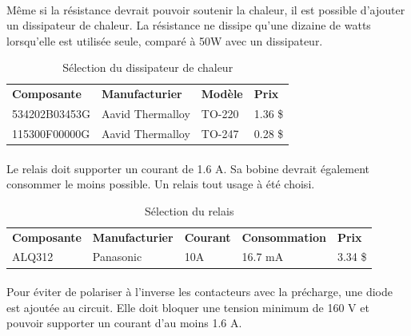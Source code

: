 		\paragraph*{}
		Même si la résistance devrait pouvoir soutenir la chaleur, il est possible d'ajouter un dissipateur de chaleur. La résistance ne dissipe qu'une dizaine de watts lorsqu'elle est utilisée seule, comparé à 50W avec un dissipateur.
				
		\begin{table}[H]
			\centering
			\caption{Sélection du dissipateur de chaleur}
			\label{DissipateurPrecharge}
			\begin{tabular}{|p{3cm}|p{4cm}|p{2cm}|p{1.5cm}|}
				\hline
				\textbf{Composante} & \textbf{Manufacturier} & \textbf{Modèle} & \textbf{Prix}
				\\ \hhline{|=|=|=|=|}
				534202B03453G  & Aavid Thermalloy & TO-220 & 1.36 \$ \\ \hline	
				115300F00000G & Aavid Thermalloy & TO-247 & 0.28 \$ \\ \hline	
			\end{tabular}
		\end{table}		 


		\paragraph*{}		
		Le relais doit supporter un courant de 1.6 A. Sa bobine devrait également consommer le moins possible. Un relais tout usage à été choisi.
		
		\begin{table}[H]
			\centering
			\caption{Sélection du relais}
			\label{RelaisPrecharge}
			\begin{tabular}{|p{3cm}|p{3cm}|p{3cm}|p{3cm}|p{3cm}|}
				\hline
				\textbf{Composante} & \textbf{Manufacturier} &  \textbf{Courant} & \textbf{Consommation} & \textbf{Prix}
				\\ \hhline{|=|=|=|=|=|}
				ALQ312 & Panasonic & 10A & 16.7 mA & 3.34 \$ \\ \hline		
			\end{tabular}
		\end{table}				
		
	
		\paragraph*{}	
		Pour éviter de polariser à l'inverse les contacteurs avec la précharge, une diode est ajoutée au circuit. Elle doit bloquer une tension minimum de 160 V et pouvoir supporter un courant d'au moins 1.6 A. 
		
